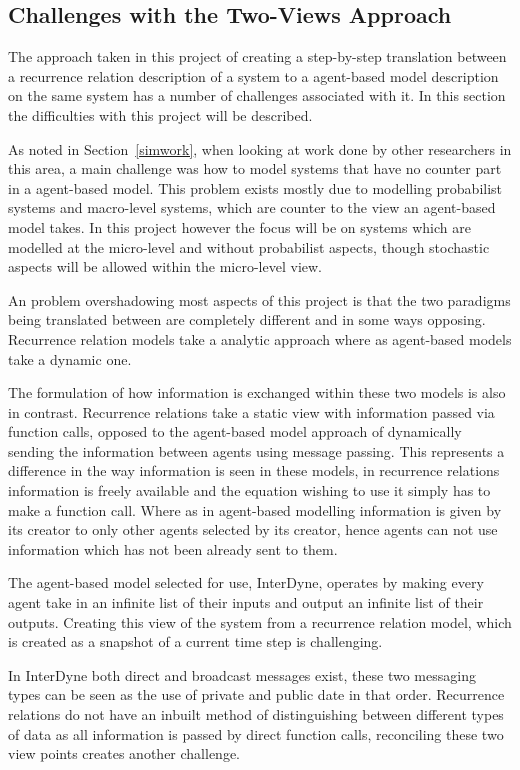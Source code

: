 \documentclass{article}
\begin{document}
\subsection{Challenges with the Two-Views Approach} \label{twoviewsapproach} 
The approach taken in this project of creating a step-by-step translation between a recurrence relation description of a system to a agent-based model description on the same system has a number of challenges associated with it. In this section the difficulties with this project will be described. 

As noted in Section~\ref{simwork}, when looking at work done by other researchers in this area, a main challenge was how to model systems that have no counter part in a agent-based model. This problem exists mostly due to modelling probabilist systems and macro-level systems, which are counter to the view an agent-based model takes. In this project however the focus will be on systems which are modelled at the micro-level and without probabilist aspects, though stochastic aspects will be allowed within the micro-level view.

An problem overshadowing most aspects of this project is  that the two paradigms being translated between are completely different and in some ways opposing. Recurrence relation models take a analytic approach where as agent-based models take a dynamic one.   

The formulation of how information is exchanged within these two models is also in contrast. Recurrence relations take a static view with information passed via function calls, opposed to the agent-based model approach of dynamically sending the information between agents using message passing. This represents a difference in the way information is seen in these models, in recurrence relations information is freely available and the equation wishing to use it simply has to make a function call. Where as in agent-based modelling information is given by its creator to only other agents selected by its creator, hence agents can not use information which has not been already sent to them.

The agent-based model selected for use, InterDyne, operates by making every agent take in an infinite list of their inputs and output an infinite list of their outputs. Creating this view of the system from a recurrence relation model, which is created as a snapshot of a current time step is challenging. 

In InterDyne both direct and broadcast messages exist, these two messaging types can be seen as the use of private and public date in that order. Recurrence relations do not have an inbuilt method of distinguishing between different types of data as all information is passed by direct function calls, reconciling these two view points creates another challenge. 
\end{document}
